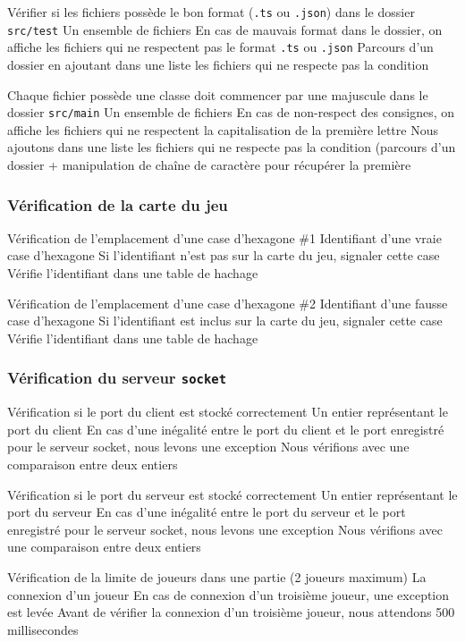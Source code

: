 \mytest
{Vérifier si les fichiers possède le bon format (\texttt{.ts} ou \texttt{.json}) dans le dossier \texttt{src/test}}
{Un ensemble de fichiers}
{En cas de mauvais format dans le dossier, on affiche les fichiers qui ne respectent pas le format \texttt{.ts} ou \texttt{.json}}
{Parcours d'un dossier en ajoutant dans une liste les fichiers qui ne respecte pas la condition}

\mytest
{Chaque fichier possède une classe doit commencer par une majuscule dans le dossier \texttt{src/main}}
{Un ensemble de fichiers}
{En cas de non-respect des consignes, on affiche les fichiers qui ne respectent la capitalisation de la première lettre}
{Nous ajoutons dans une liste les fichiers qui ne respecte pas la condition (parcours d'un dossier + manipulation de chaîne de caractère pour récupérer la première}

\subsubsection{Vérification de la carte du jeu}

\mytest
{Vérification de l'emplacement d'une case d'hexagone \#1}
{Identifiant d'une vraie case d'hexagone}
{Si l'identifiant n'est pas sur la carte du jeu, signaler cette case}
{Vérifie l'identifiant dans une table de hachage}

\mytest
{Vérification de l'emplacement d'une case d'hexagone \#2}
{Identifiant d'une fausse case d'hexagone}
{Si l'identifiant est inclus sur la carte du jeu, signaler cette case}
{Vérifie l'identifiant dans une table de hachage}

\subsubsection{Vérification du serveur {\tt socket}}

\mytest
{Vérification si le port du client est stocké correctement}
{Un entier représentant le port du client}
{En cas d'une inégalité entre le port du client et le port enregistré pour le serveur socket, nous levons une exception}
{Nous vérifions avec une comparaison entre deux entiers}

\mytest
{Vérification si le port du serveur est stocké correctement}
{Un entier représentant le port du serveur}
{En cas d'une inégalité entre le port du serveur et le port enregistré pour le serveur socket, nous levons une exception}
{Nous vérifions avec une comparaison entre deux entiers}

\mytest
{Vérification de la limite de joueurs dans une partie (2 joueurs maximum)}
{La connexion d'un joueur}
{En cas de connexion d'un troisième joueur, une exception est levée}
{Avant de vérifier la connexion d'un troisième joueur, nous attendons 500 millisecondes}

